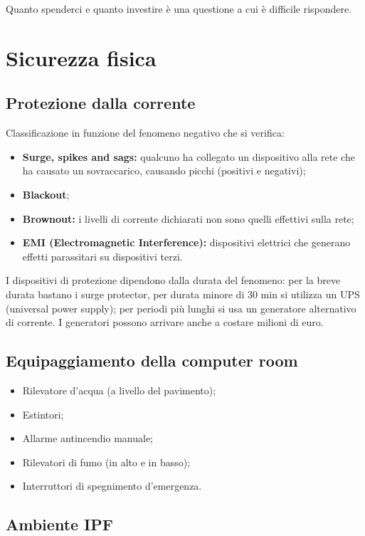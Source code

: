 Quanto spenderci e quanto investire è una questione a cui è difficile 
rispondere.

\section{Sicurezza fisica}
\label{SFDP:fisica}
\subsection{Protezione dalla corrente}

Classificazione in funzione del fenomeno negativo che si verifica:
\begin{itemize}
\item \textbf{Surge, spikes and sags:} qualcuno ha collegato un dispositivo alla rete che 
ha causato un sovraccarico, causando picchi (positivi e negativi);
\item \textbf{Blackout};
\item \textbf{Brownout:} i livelli di corrente dichiarati non sono quelli effettivi sulla 
rete;
\item \textbf{EMI (Electromagnetic Interference):} dispositivi elettrici che generano 
effetti parassitari su dispositivi terzi.
\end{itemize}

I dispositivi di protezione dipendono dalla durata del fenomeno: per la breve
durata bastano i surge protector, per durata minore di 30 min si utilizza un UPS 
(universal power supply); per periodi più lunghi si usa un generatore 
alternativo di corrente. I generatori possono arrivare anche a costare milioni 
di euro.

\subsection{Equipaggiamento della computer room}

\begin{itemize}
\item Rilevatore d'acqua (a livello del pavimento);
\item Estintori;
\item Allarme antincendio manuale;
\item Rilevatori di fumo (in alto e in basso);
\item Interruttori di spegnimento d'emergenza.
\end{itemize}

\subsection{Ambiente IPF}


